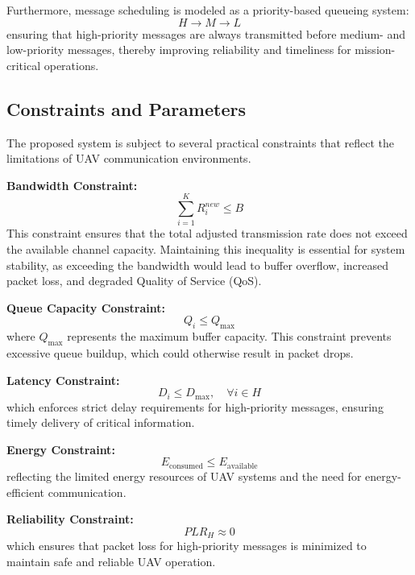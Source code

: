 \documentclass[pdflatex,sn-mathphys-num]{sn-jnl}%
\theoremstyle{thmstyleone}%
\theoremstyle{thmstyletwo}%
\theoremstyle{thmstylethree}%
\begin{document}
Furthermore, message scheduling is modeled as a priority-based queueing system:
\begin{equation}
H \rightarrow M \rightarrow L
\label{eq:priority_queue}
\end{equation}
ensuring that high-priority messages are always transmitted before medium- and low-priority messages, thereby improving reliability and timeliness for mission-critical operations.

\subsection{ Constraints and Parameters }

The proposed system is subject to several practical constraints that reflect the limitations of UAV communication environments.

\textbf{Bandwidth Constraint:}
\begin{equation}
\sum_{i=1}^{K} R_i^{new} \leq B
\label{eq:bandwidth_constraint}
\end{equation}
This constraint ensures that the total adjusted transmission rate does not exceed the available channel capacity. Maintaining this inequality is essential for system stability, as exceeding the bandwidth would lead to buffer overflow, increased packet loss, and degraded Quality of Service (QoS).

\textbf{Queue Capacity Constraint:}
\begin{equation}
Q_i \leq Q_{\max}
\label{eq:queue_constraint}
\end{equation}
where $Q_{\max}$ represents the maximum buffer capacity. This constraint prevents excessive queue buildup, which could otherwise result in packet drops.

\textbf{Latency Constraint:}
\begin{equation}
D_i \leq D_{\max}, \quad \forall i \in H
\label{eq:latency_constraint}
\end{equation}
which enforces strict delay requirements for high-priority messages, ensuring timely delivery of critical information.

\textbf{Energy Constraint:}
\begin{equation}
E_{\text{consumed}} \leq E_{\text{available}}
\label{eq:energy_constraint}
\end{equation}
reflecting the limited energy resources of UAV systems and the need for energy-efficient communication.

\textbf{Reliability Constraint:}
\begin{equation}
PLR_H \approx 0
\label{eq:reliability_constraint}
\end{equation}
which ensures that packet loss for high-priority messages is minimized to maintain safe and reliable UAV operation.
\end{document}
